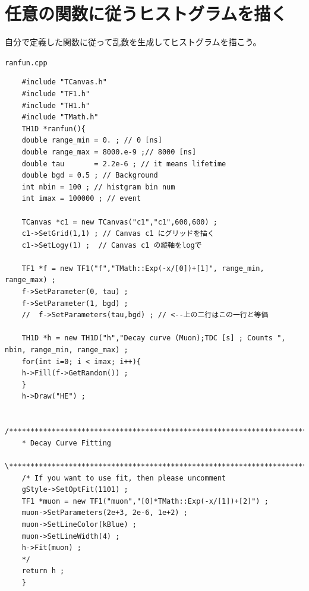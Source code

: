 \documentclass{jarticle}
\begin{document}
 \section{任意の関数に従うヒストグラムを描く}
 自分で定義した関数に従って乱数を生成してヒストグラムを描こう。
 \begin{itembox}{\texttt{ranfun.cpp}}
\begin{verbatim}
	#include "TCanvas.h"
	#include "TF1.h"
	#include "TH1.h"
	#include "TMath.h"
	TH1D *ranfun(){
	double range_min = 0. ; // 0 [ns]
	double range_max = 8000.e-9 ;// 8000 [ns]
	double tau       = 2.2e-6 ; // it means lifetime
	double bgd = 0.5 ; // Background
	int nbin = 100 ; // histgram bin num
	int imax = 100000 ; // event

	TCanvas *c1 = new TCanvas("c1","c1",600,600) ;
	c1->SetGrid(1,1) ; // Canvas c1 にグリッドを描く
	c1->SetLogy(1) ;  // Canvas c1 の縦軸をlogで

	TF1 *f = new TF1("f","TMath::Exp(-x/[0])+[1]", range_min, range_max) ;
	f->SetParameter(0, tau) ;
	f->SetParameter(1, bgd) ;
	//  f->SetParameters(tau,bgd) ; // <--上の二行はこの一行と等価

	TH1D *h = new TH1D("h","Decay curve (Muon);TDC [s] ; Counts ", nbin, range_min, range_max) ;
	for(int i=0; i < imax; i++){
	h->Fill(f->GetRandom()) ;
	}
	h->Draw("HE") ;

	/********************************************************************************\
	* Decay Curve Fitting
	\********************************************************************************/
	/* If you want to use fit, then please uncomment
	gStyle->SetOptFit(1101) ;
	TF1 *muon = new TF1("muon","[0]*TMath::Exp(-x/[1])+[2]") ;
	muon->SetParameters(2e+3, 2e-6, 1e+2) ;
	muon->SetLineColor(kBlue) ;
	muon->SetLineWidth(4) ;
	h->Fit(muon) ;
	*/
	return h ;
	}
\end{verbatim}
 \end{itembox}
\end{document}
